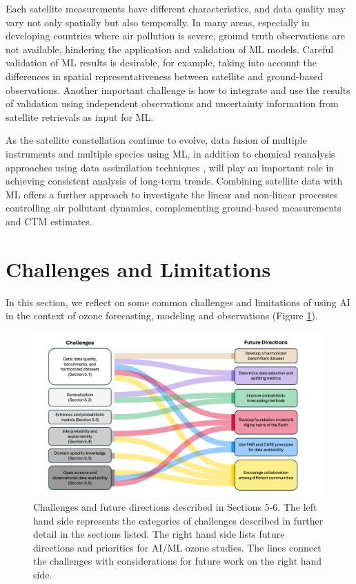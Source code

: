 \documentclass[gmd, manuscript]{copernicus}
\begin{document}
Each satellite measurements have different characteristics, and data quality may vary not only spatially but also temporally. In many areas, especially in developing countries where air pollution is severe, ground truth observations are not available, hindering the application and validation of ML models. Careful validation of ML results is desirable, for example, taking into account the differences in spatial representativeness between satellite and ground-based observations. Another important challenge is how to integrate and use the results of validation using independent observations and uncertainty information from satellite retrievals as input for ML.

As the satellite constellation continue to evolve, data fusion of multiple instruments and multiple species using ML, in addition to chemical reanalysis approaches using data assimilation techniques \citep{inness_cams_2019, miyazaki_updated_2020}, will play an important role in achieving consistent analysis of long-term trends. Combining satellite data with ML offers a further approach to investigate the linear and non-linear processes controlling air pollutant dynamics, complementing ground-based measurements and CTM estimates.


\section{Challenges and Limitations}
In this section, we reflect on some common challenges and limitations of using AI in the context of ozone forecasting, modeling and observations (Figure \ref{fig:sankey}). 


\begin{figure}
    \centering
    \includegraphics[width=0.85\linewidth]{figures/sankey.png}
    \caption{Challenges and future directions described in Sections 5-6. The left hand side represents the categories of challenges described in further detail in the sections listed. The right hand side lists future directions and priorities for AI/ML ozone studies. The lines connect the challenges with considerations for future work on the right hand side.}
    \label{fig:sankey}
\end{figure}
\end{document}
